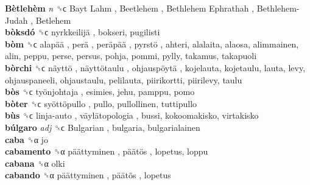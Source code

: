 \textbf{Bètlehèm} \emph{n}  ␝ϲ   Bayt Lahm ,  Beetlehem ,  Bethlehem Ephrathah ,  Bethlehem-Judah ,  Betlehem   \\
\textbf{bòksdó} ␝ϲ   nyrkkeilijä , bokseri, pugilisti  \\
\textbf{bòm} ␝ϲ   alapää ,  perä ,  peräpää ,  pyrstö , ahteri, alalaita, alaosa, alimmainen, alin, peppu, perse, persus, pohja, pommi, pylly, takamus, takapuoli  \\
\textbf{bòrchi} ␝ϲ   näyttö ,  näyttötaulu ,  ohjauspöytä , kojelauta, kojetaulu, lauta, levy, ohjauspaneeli, ohjaustaulu, pelilauta, piirikortti, piirilevy, taulu  \\
\textbf{bòs} ␝ϲ   työnjohtaja , esimies, jehu, pamppu, pomo  \\
\textbf{bòter} ␝ϲ   syöttöpullo , pullo, pullollinen, tuttipullo  \\
\textbf{bùs} ␝ϲ   linja-auto ,  väylätopologia , bussi, kokoomakisko, virtakisko  \\
\textbf{búlgaro} \emph{adj}  ␝ϲ   Bulgarian , bulgaria, bulgarialainen  \\
\textbf{caba} ␝α  jo  \\
\textbf{cabamento} ␝α   päättyminen ,  päätös , lopetus, loppu  \\
\textbf{cabana} ␝α  olki  \\
\textbf{cabando} ␝α   päättyminen ,  päätös , lopetus  \\
